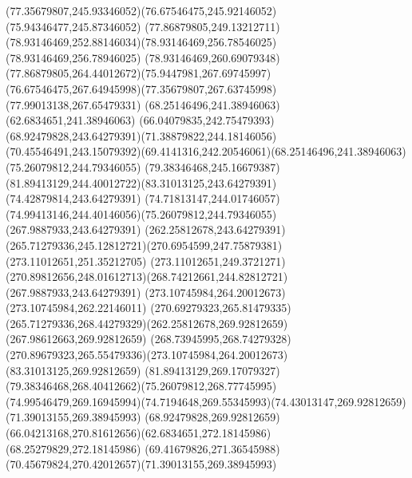 {{	\curveto(77.35679807,245.93346052)(76.67546475,245.92146052)(75.94346477,245.87346052)
	\curveto(77.86879805,249.13212711)(78.93146469,252.88146034)(78.93146469,256.78546025)
	\lineto(78.93146469,256.78946025)
	\curveto(78.93146469,260.69079348)(77.86879805,264.44012672)(75.9447981,267.69745997)
	\curveto(76.67546475,267.64945998)(77.35679807,267.63745998)(77.99013138,267.65479331)
	\moveto(68.25146496,241.38946063)
	\lineto(62.6834651,241.38946063)
	\curveto(66.04079835,242.75479393)(68.92479828,243.64279391)(71.38879822,244.18146056)
	\curveto(70.45546491,243.15079392)(69.4141316,242.20546061)(68.25146496,241.38946063)
	\moveto(75.26079812,244.79346055)
	\curveto(79.38346468,245.16679387)(81.89413129,244.40012722)(83.31013125,243.64279391)
	\lineto(74.42879814,243.64279391)
	\curveto(74.71813147,244.01746057)(74.99413146,244.40146056)(75.26079812,244.79346055)
	\moveto(267.9887933,243.64279391)
	\lineto(262.25812678,243.64279391)
	\curveto(265.71279336,245.12812721)(270.6954599,247.75879381)(273.11012651,251.35212705)
	\lineto(273.11012651,249.3721271)
	\curveto(270.89812656,248.01612713)(268.74212661,244.82812721)(267.9887933,243.64279391)
	\moveto(273.10745984,264.20012673)
	\lineto(273.10745984,262.22146011)
	\curveto(270.69279323,265.81479335)(265.71279336,268.44279329)(262.25812678,269.92812659)
	\lineto(267.98612663,269.92812659)
	\curveto(268.73945995,268.74279328)(270.89679323,265.55479336)(273.10745984,264.20012673)
	\moveto(83.31013125,269.92812659)
	\curveto(81.89413129,269.17079327)(79.38346468,268.40412662)(75.26079812,268.77745995)
	\curveto(74.99546479,269.16945994)(74.7194648,269.55345993)(74.43013147,269.92812659)
	\closepath
	\moveto(71.39013155,269.38945993)
	\curveto(68.92479828,269.92812659)(66.04213168,270.81612656)(62.6834651,272.18145986)
	\lineto(68.25279829,272.18145986)
	\curveto(69.41679826,271.36545988)(70.45679824,270.42012657)(71.39013155,269.38945993)
}
}
